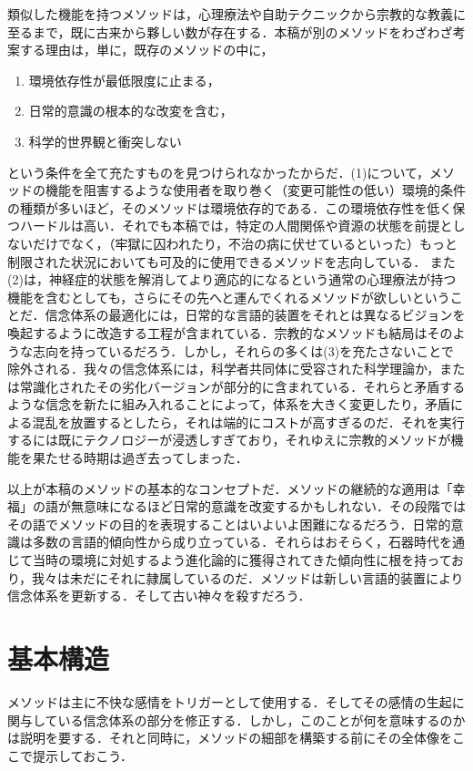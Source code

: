 類似した機能を持つメソッドは，心理療法や自助テクニックから宗教的な教義に至るまで，既に古来から夥しい数が存在する．本稿が別のメソッドをわざわざ考案する理由は，単に，既存のメソッドの中に，
\begin{enumerate}[label=(\arabic*)]
    \item 環境依存性が最低限度に止まる，
    \item 日常的意識の根本的な改変を含む，
    \item 科学的世界観と衝突しない
\end{enumerate}
という条件を全て充たすものを見つけられなかったからだ．(1)について，メソッドの機能を阻害するような使用者を取り巻く（変更可能性の低い）環境的条件の種類が多いほど，そのメソッドは環境依存的である．この環境依存性を低く保つハードルは高い．それでも本稿では，特定の人間関係や資源の状態を前提としないだけでなく，（牢獄に囚われたり，不治の病に伏せているといった）もっと制限された状況においても可及的に使用できるメソッドを志向している．
また(2)は，神経症的状態を解消してより適応的になるという通常の心理療法が持つ機能を含むとしても，さらにその先へと運んでくれるメソッドが欲しいということだ．信念体系の最適化には，日常的な言語的装置をそれとは異なるビジョンを喚起するように改造する工程が含まれている．宗教的なメソッドも結局はそのような志向を持っているだろう．しかし，それらの多くは(3)を充たさないことで除外される．我々の信念体系には，科学者共同体に受容された科学理論か，または常識化されたその劣化バージョンが部分的に含まれている．それらと矛盾するような信念を新たに組み入れることによって，体系を大きく変更したり，矛盾による混乱を放置するとしたら，それは端的にコストが高すぎるのだ．それを実行するには既にテクノロジーが浸透しすぎており，それゆえに宗教的メソッドが機能を果たせる時期は過ぎ去ってしまった．

以上が本稿のメソッドの基本的なコンセプトだ．メソッドの継続的な適用は「幸福」の語が無意味になるほど日常的意識を改変するかもしれない．その段階ではその語でメソッドの目的を表現することはいよいよ困難になるだろう．日常的意識は多数の言語的傾向性から成り立っている．それらはおそらく，石器時代を通じて当時の環境に対処するよう進化論的に獲得されてきた傾向性に根を持っており，我々は未だにそれに隷属しているのだ．メソッドは新しい言語的装置により信念体系を更新する．そして古い神々を殺すだろう．

\section{基本構造}
\label{sec:基本構造}

メソッドは主に不快な感情をトリガーとして使用する．そしてその感情の生起に関与している信念体系の部分を修正する．しかし，このことが何を意味するのかは説明を要する．それと同時に，メソッドの細部を構築する前にその全体像をここで提示しておこう．


